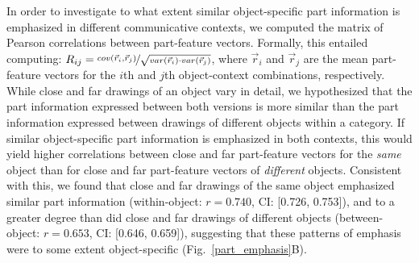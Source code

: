 \documentclass[10pt,letterpaper]{article}
\begin{document}
In order to investigate to what extent similar object-specific part information is emphasized in different communicative contexts, we computed the matrix of Pearson correlations between part-feature vectors. 
Formally, this entailed computing: $R_{ij} =  \nicefrac{cov(\vec{r}_{i}, \vec{r}_{j})}{\sqrt{var(\vec{r}_{i}) \cdot var(\vec{r}_{j})}}$, where $\vec{r}_{i}$ and $\vec{r}_{j}$ are the mean part-feature vectors for the $i$th and $j$th object-context combinations, respectively.
While close and far drawings of an object vary in detail, we hypothesized that the part information expressed between both versions is more similar than the part information expressed between drawings of different objects within a category.
If similar object-specific part information is emphasized in both contexts, this would yield higher correlations between close and far part-feature vectors for the \textit{same} object than for close and far part-feature vectors of \textit{different} objects. 
Consistent with this, we found that close and far drawings of the same object emphasized similar part information (within-object: $r = 0.740$,  CI: [0.726, 0.753]), and to a greater degree than did close and far drawings of different objects (between-object: $r = 0.653$, CI: [0.646, 0.659]), suggesting that these patterns of emphasis were to some extent object-specific (Fig.~\ref{part_emphasis}B). 

\end{document}
